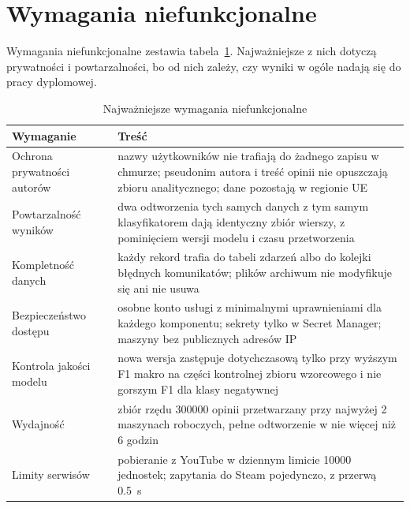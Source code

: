 \section{Wymagania niefunkcjonalne}
\label{sec:req-nonfunctional}

Wymagania niefunkcjonalne zestawia tabela~\ref{tab:nonfunctional-requirements}.
Najważniejsze z nich dotyczą prywatności i powtarzalności, bo od nich zależy, czy wyniki w ogóle nadają się do pracy dyplomowej.

\begin{table}[hbp]
  \caption{Najważniejsze wymagania niefunkcjonalne}
  \label{tab:nonfunctional-requirements}
  \centering
  \small
  \begin{tabular}{|p{}|p{}|}
    \hline
    Wymaganie                    & Treść                                                                                                                                             \\
    \hline
    Ochrona prywatności autorów  & nazwy użytkowników nie trafiają do żadnego zapisu w chmurze; pseudonim autora i treść opinii nie opuszczają zbioru analitycznego; dane pozostają w regionie UE \\
    \hline
    Powtarzalność wyników        & dwa odtworzenia tych samych danych z tym samym klasyfikatorem dają identyczny zbiór wierszy, z pominięciem wersji modelu i czasu przetworzenia      \\
    \hline
    Kompletność danych           & każdy rekord trafia do tabeli zdarzeń albo do kolejki błędnych komunikatów; plików archiwum nie modyfikuje się ani nie usuwa                         \\
    \hline
    Bezpieczeństwo dostępu       & osobne konto usługi z minimalnymi uprawnieniami dla każdego komponentu; sekrety tylko w Secret Manager; maszyny bez publicznych adresów IP            \\
    \hline
    Kontrola jakości modelu      & nowa wersja zastępuje dotychczasową tylko przy wyższym F1 makro na części kontrolnej zbioru wzorcowego i nie gorszym F1 dla klasy negatywnej          \\
    \hline
    Wydajność                    & zbiór rzędu \num{300000} opinii przetwarzany przy najwyżej 2 maszynach roboczych, pełne odtworzenie w nie więcej niż 6 godzin                       \\
    \hline
    Limity serwisów              & pobieranie z YouTube w dziennym limicie \num{10000} jednostek; zapytania do Steam pojedynczo, z przerwą \qty{0.5}{\second}                          \\

\end{tabular}
\end{table}
